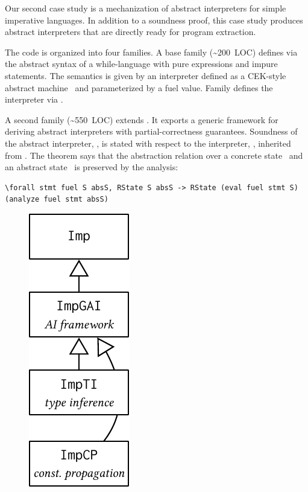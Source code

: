 
Our second case study is a mechanization of abstract interpreters
for simple imperative languages.
In addition to a soundness proof, this case study produces abstract
interpreters that are directly ready for program extraction.

The code is organized into four families.
A base family  (\textasciitilde 200~LOC) defines via  the abstract
syntax of a while-language with pure expressions and impure statements.
The semantics is given by an interpreter defined as a CEK-style abstract
machine~\cite{felleisen1986control} and parameterized by a fuel value.
Family  defines the interpreter via .

A second family  (\textasciitilde 550~LOC) extends .
It exports a generic framework for deriving
abstract interpreters with partial-correctness guarantees.
Soundness of the abstract interpreter, ,
is stated with respect to the interpreter, , inherited from .
The theorem says that the abstraction relation  over a
concrete state~ and an abstract state~ is preserved
by the analysis:

\begin{centered}
\begin{minipage}{.91\textwidth}
\begin{lstlisting}[basicstyle=\fontsize{8.25}{9}\ttfamily]
\forall stmt fuel S absS, RState S absS -> RState (eval fuel stmt S) (analyze fuel stmt absS)
\end{lstlisting}
\end{minipage}
\end{centered}

\begin{figure}
\includegraphics[scale=.68]{graphics/ai-casestudy.pdf}
\end{figure}

